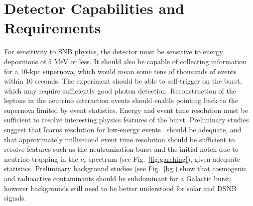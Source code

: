 
\section{Detector Capabilities and Requirements}
\label{sec:physics-snblowe-detector-requirements}

For sensitivity to SNB physics, the detector must be sensitive to energy depositions of 5 MeV or less.  It should also be capable of collecting information for a 10-kpc supernova, which would mean some tens of thousands of events within 10 seconds.    The experiment should be able to self-trigger on the burst, which may require sufficiently good photon detection.  Reconstruction of the leptons in the neutrino interaction events should enable pointing back to the supernova limited by event statistics.
Energy and event time resolution must be sufficient to resolve interesting physics features of the burst.  Preliminary studies suggest that Icarus resolution for low-energy events~\cite{Amoruso:2003sw} should be adequate, and that approximately millisecond event time resolution should be sufficient to resolve features such as the neutronization burst and the initial notch due to neutrino trapping in the $\nu_e$ spectrum (see Fig.~\ref{fig:garching}), given adequate statistics.   Preliminary background studies (see Fig.~\ref{bg}) show that cosmogenic and radioactive contaminants should be subdominant for a Galactic burst; however backgrounds still need to be better understood for solar and DSNB signals.


